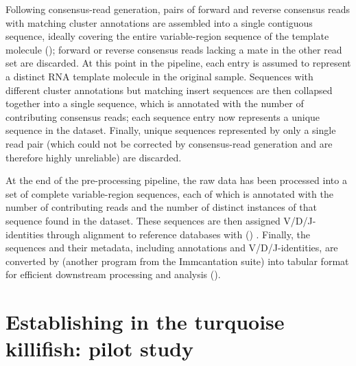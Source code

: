 Following consensus-read generation, pairs of forward and reverse consensus reads with matching cluster annotations are assembled into a single contiguous sequence, ideally covering the entire variable-region sequence of the template molecule (); forward or reverse consensus reads lacking a mate in the other read set are discarded. At this point in the pipeline, each entry is assumed to represent a distinct RNA template molecule in the original sample. Sequences with different cluster annotations but matching insert sequences are then collapsed together into a single sequence, which is annotated with the number of contributing consensus reads; each sequence entry now represents a unique sequence in the dataset. Finally, unique sequences represented by only a single read pair (which could not be corrected by consensus-read generation and are therefore highly unreliable) are discarded.

At the end of the  pre-processing pipeline, the raw data has been processed into a set of complete variable-region sequences, each of which is annotated with the number of contributing reads and the number of distinct instances of that sequence found in the dataset. These sequences are then assigned V/D/J-identities through alignment to reference databases with  () \parencite{ye2013igblast}. Finally, the sequences and their metadata, including annotations and V/D/J-identities, are converted by  (another program from the Immcantation suite) \parencite{gupta2015changeo} into tabular format for efficient downstream processing and analysis ().

\FloatBarrier
\clearpage

\section{Establishing \igseq in the turquoise killifish: pilot study}
\label{sec:igseq_pilot}

